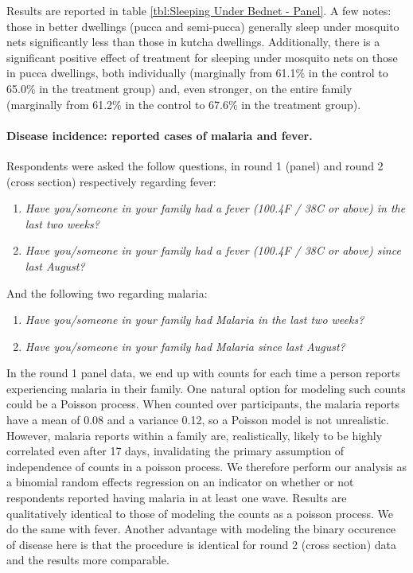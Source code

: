 \documentclass[a4paper,12pt]{article}
\begin{document}
Results are reported in table \ref{tbl:Sleeping Under Bednet - Panel}. A few notes: those in better dwellings (pucca and semi-pucca) generally sleep under mosquito nets significantly less than those in kutcha dwellings. Additionally, there is a significant positive effect of treatment for sleeping under mosquito nets on those in pucca dwellings, both individually (marginally from 61.1\% in the control to 65.0\% in the treatment group) and, even stronger, on the entire family (marginally from 61.2\% in the control to 67.6\% in the treatment group).




\paragraph{Disease incidence: reported cases of malaria and fever.} Respondents were asked the follow questions, in round 1 (panel) and round 2 (cross section) respectively regarding fever:
\begin{enumerate}
\item \textit{Have you/someone in your family had a fever (100.4F / 38C or above) in the last two weeks?}
\item \textit{Have you/someone in your family had a fever (100.4F / 38C or above) since last August?}
\end{enumerate}

\noindent And the following two regarding malaria:
\begin{enumerate}
\item \textit{Have you/someone in your family had Malaria in the last two weeks?}
\item \textit{Have you/someone in your family had Malaria since last August?}
\end{enumerate}

In the round 1 panel data, we end up with counts for each time a person reports experiencing malaria in their family. One natural option for modeling such counts could be a Poisson process. When counted over participants, the malaria reports have a mean of 0.08 and a variance 0.12, so a Poisson model is not unrealistic. However, malaria reports within a family are, realistically, likely to be highly correlated even after 17 days, invalidating the primary assumption of independence of counts in a poisson process. We therefore perform our analysis as a binomial random effects regression on an indicator on whether or not respondents reported having malaria in at least one wave. Results are qualitatively identical to those of modeling the counts as a poisson process. We do the same with fever. Another advantage with modeling the binary occurence of disease here is that the procedure is identical for round 2 (cross section) data and the results more comparable.
\end{document}
